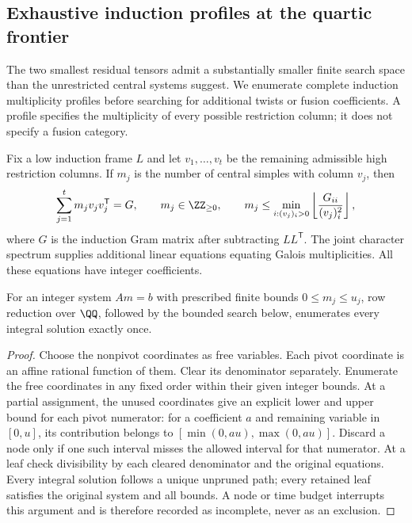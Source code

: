 \subsection{Exhaustive induction profiles at the quartic frontier}
\label{subsec:round4-quartic-profiles}
The two smallest residual tensors admit a substantially smaller finite
search space than the unrestricted central systems suggest.  We enumerate
complete induction multiplicity profiles before searching for additional
twists or fusion coefficients.  A profile specifies the multiplicity of
every possible restriction column; it does not specify a fusion category.

Fix a low induction frame $L$ and let $v_1,\ldots,v_t$ be the remaining
admissible high restriction columns.  If $m_j$ is the number of central
simples with column $v_j$, then
\[
 \sum_{j=1}^t m_jv_jv_j^{\mathsf T}=G,
 \qquad m_j\in\ZZ_{\geq0},
 \qquad
 m_j\leq \min_{i:(v_j)_i>0}
       \left\lfloor\frac{G_{ii}}{(v_j)_i^2}\right\rfloor,
\]
where $G$ is the induction Gram matrix after subtracting $LL^{\mathsf T}$.
The joint character spectrum supplies additional linear equations equating
Galois multiplicities.  All these equations have integer coefficients.

\begin{proposition}
\label{prop:round4-affine-profile-enumeration}
For an integer system $Am=b$ with prescribed finite bounds
$0\leq m_j\leq u_j$, row reduction over $\QQ$, followed by the bounded
search below, enumerates every integral solution exactly once.
\end{proposition}
\begin{proof}
Choose the nonpivot coordinates as free variables.  Each pivot coordinate
is an affine rational function of them.  Clear its denominator separately.
Enumerate the free coordinates in any fixed order within their given
integer bounds.  At a partial assignment, the unused coordinates give an
explicit lower and upper bound for each pivot numerator: for a coefficient
$a$ and remaining variable in $[0,u]$, its contribution belongs to
$[\min(0,au),\max(0,au)]$.  Discard a node only if one such interval misses
the allowed interval for that numerator.  At a leaf check divisibility by
each cleared denominator and the original equations.  Every integral
solution follows a unique unpruned path; every retained leaf satisfies the
original system and all bounds.  A node or time budget interrupts this
argument and is therefore recorded as incomplete, never as an exclusion.
\end{proof}

